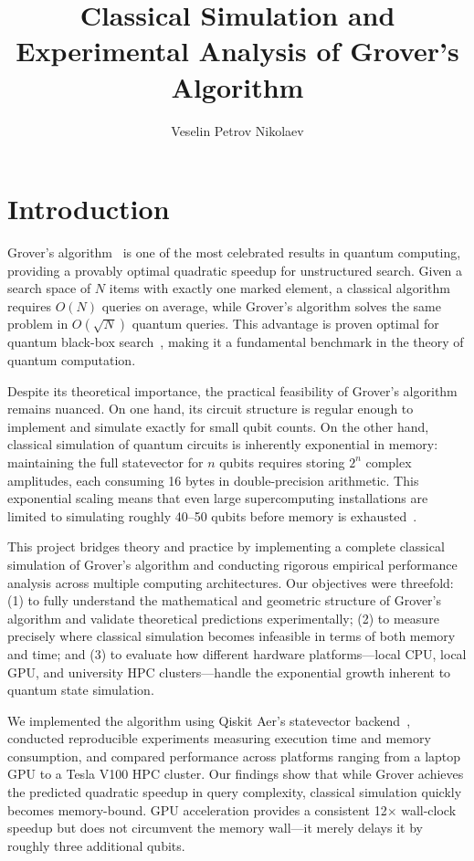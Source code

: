 \documentclass[sigconf, authorversion, nonacm]{acmart}
\title{Classical Simulation and Experimental Analysis of Grover's Algorithm}
\author{Veselin Petrov Nikolaev}
\affiliation{%
  \institution{University of Luxembourg}
  \department{Faculty of Science, Technology and Medicine}
  \city{Luxembourg}
  \country{Luxembourg}
}
\begin{document}
\maketitle

\section{Introduction}

Grover's algorithm~\cite{Grover1996} is one of the most celebrated results in quantum computing, providing a provably optimal quadratic speedup for unstructured search. Given a search space of $N$ items with exactly one marked element, a classical algorithm requires $O(N)$ queries on average, while Grover's algorithm solves the same problem in $O(\sqrt{N})$ quantum queries. This advantage is proven optimal for quantum black-box search~\cite{Bennett1997}, making it a fundamental benchmark in the theory of quantum computation.

Despite its theoretical importance, the practical feasibility of Grover's algorithm remains nuanced. On one hand, its circuit structure is regular enough to implement and simulate exactly for small qubit counts. On the other hand, classical simulation of quantum circuits is inherently exponential in memory: maintaining the full statevector for $n$ qubits requires storing $2^n$ complex amplitudes, each consuming 16 bytes in double-precision arithmetic. This exponential scaling means that even large supercomputing installations are limited to simulating roughly 40--50 qubits before memory is exhausted~\cite{Smelyanskiy2016, Haener2017}.

This project bridges theory and practice by implementing a complete classical simulation of Grover's algorithm and conducting rigorous empirical performance analysis across multiple computing architectures. Our objectives were threefold: (1) to fully understand the mathematical and geometric structure of Grover's algorithm and validate theoretical predictions experimentally; (2) to measure precisely where classical simulation becomes infeasible in terms of both memory and time; and (3) to evaluate how different hardware platforms---local CPU, local GPU, and university HPC clusters---handle the exponential growth inherent to quantum state simulation.

We implemented the algorithm using Qiskit Aer's statevector backend~\cite{Qiskit}, conducted reproducible experiments measuring execution time and memory consumption, and compared performance across platforms ranging from a laptop GPU to a Tesla V100 HPC cluster. Our findings show that while Grover achieves the predicted quadratic speedup in query complexity, classical simulation quickly becomes memory-bound. GPU acceleration provides a consistent 12$\times$ wall-clock speedup but does not circumvent the memory wall---it merely delays it by roughly three additional qubits.
\end{document}
